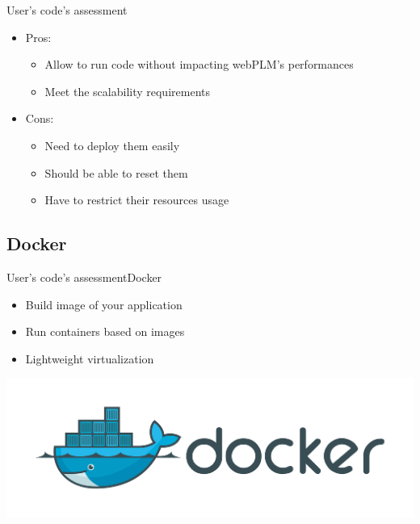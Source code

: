 \documentclass{beamer}
\begin{document}
\begin{frame}{User's code's assessment}{}
  \begin{itemize}
  \item {
    Pros:
    \begin{itemize}
    \item Allow to run code without impacting webPLM's performances
    \item Meet the scalability requirements 
    \end{itemize}
    \pause
  }
  \item {
    Cons:
    \begin{itemize}
    \item Need to deploy them easily
    \item Should be able to reset them
    \item Have to restrict their resources usage
    \end{itemize}
  }
  \end{itemize}
\end{frame}

\subsection{Docker}

\begin{frame}{User's code's assessment}{Docker}
  \begin{itemize}
  \item {
    Build image of your application
  }
  \item {
    Run containers based on images
  }
  \item {
    Lightweight virtualization
  }
  \end{itemize}
  \begin{center}
    \includegraphics[scale=0.2]{img/docker-logo.png}
  \end{center}
\end{frame}
\end{document}
